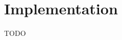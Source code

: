 \documentclass[../main.tex]{subfiles}
\begin{document}
\chapter{Implementation}

TODO
\end{document}
